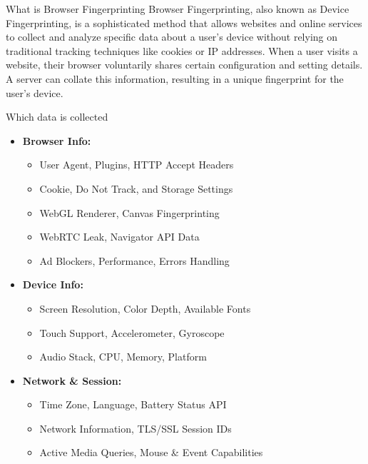 \begin{frame}{What is Browser Fingerprinting}
  Browser Fingerprinting, also known as Device Fingerprinting, is a sophisticated method that allows websites and online services to collect and analyze specific data about a user's device without relying on traditional tracking techniques like cookies or IP addresses. 
  When a user visits a website, their browser voluntarily shares certain configuration and setting details. 
  A server can collate this information, resulting in a unique fingerprint for the user's device.
\end{frame}

\begin{frame}{Which data is collected}
  \begin{itemize}
    \item \textbf{Browser Info:} 
    \begin{itemize}
        \item User Agent, Plugins, HTTP Accept Headers
        \item Cookie, Do Not Track, and Storage Settings
        \item WebGL Renderer, Canvas Fingerprinting
        \item WebRTC Leak, Navigator API Data
        \item Ad Blockers, Performance, Errors Handling
    \end{itemize}

    \item \textbf{Device Info:}
    \begin{itemize}
        \item Screen Resolution, Color Depth, Available Fonts
        \item Touch Support, Accelerometer, Gyroscope
        \item Audio Stack, CPU, Memory, Platform
    \end{itemize}

    \item \textbf{Network \& Session:}
    \begin{itemize}
        \item Time Zone, Language, Battery Status API
        \item Network Information, TLS/SSL Session IDs
        \item Active Media Queries, Mouse \& Event Capabilities
    \end{itemize}
  \end{itemize}
\end{frame}

